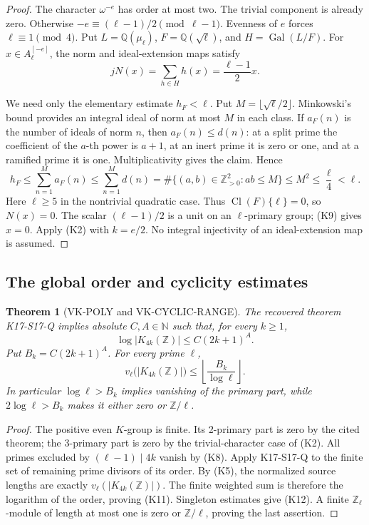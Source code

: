 \documentclass[11pt,a4paper]{article}
\newtheorem{theorem}{Theorem}[section]
\theoremstyle{definition}
\begin{document}
\begin{proof}
The character \(\omega^{-e}\) has order at most two.
The trivial component is already zero. Otherwise
\(-e\equiv(\ell-1)/2\pmod{\ell-1}\).
Evenness of \(e\) forces \(\ell\equiv1\pmod4\).
Put \(L=\mathbb Q(\mu_\ell)\),
\(F=\mathbb Q(\sqrt\ell)\), and \(H=\operatorname{Gal}(L/F)\).
For \(x\in A_\ell^{[-e]}\), the norm and ideal-extension maps
satisfy
\[
 jN(x)=\sum_{h\in H}h(x)=\frac{\ell-1}{2}x.           \tag{K9}
\]

We need only the elementary estimate \(h_F<\ell\).
Put \(M=\lfloor\sqrt\ell/2\rfloor\).
Minkowski's bound \cite[Theorem~4.3, p.~70]{MilneANT}
provides an integral ideal of norm at most \(M\) in each class.
If \(a_F(n)\) is the number of ideals of norm \(n\), then
\(a_F(n)\le d(n)\): at a split prime the coefficient of
the \(a\)-th power is \(a+1\), at an inert prime it is zero or
one, and at a ramified prime it is one. Multiplicativity gives
the claim. Hence
\[
 h_F\le\sum_{n=1}^M a_F(n)
 \le\sum_{n=1}^M d(n)
 =\#\{(a,b)\in\mathbb Z_{>0}^2:ab\le M\}
 \le M^2\le\frac{\ell}{4}<\ell.                      \tag{K10}
\]
Here \(\ell\ge5\) in the nontrivial quadratic case.
Thus \(\operatorname{Cl}(F)\{\ell\}=0\), so \(N(x)=0\).
The scalar \((\ell-1)/2\) is a unit on an \(\ell\)-primary
group; (K9) gives \(x=0\). Apply (K2) with \(k=e/2\).
No integral injectivity of an ideal-extension map is assumed.
\end{proof}

\subsection{The global order and cyclicity estimates}

\begin{theorem}[VK-POLY and VK-CYCLIC-RANGE]
The recovered theorem K17-S17-Q implies absolute
\(C,A\in\mathbb N\) such that, for every \(k\ge1\),
\[
 \log|K_{4k}(\mathbb Z)|\le C(2k+1)^A.               \tag{K11}
\]
Put \(B_k=C(2k+1)^A\). For every prime \(\ell\),
\[
 v_\ell\bigl(|K_{4k}(\mathbb Z)|\bigr)
       \le\left\lfloor\frac{B_k}{\log\ell}\right\rfloor. \tag{K12}
\]
In particular \(\log\ell>B_k\) implies vanishing of the primary
part, while \(2\log\ell>B_k\) makes it either zero or
\(\mathbb Z/\ell\).
\end{theorem}

\begin{proof}
The positive even \(K\)-group is finite. Its 2-primary part is
zero by the cited theorem; the 3-primary part is zero by the
trivial-character case of (K2). All primes excluded by
\((\ell-1)\mid4k\) vanish by (K8).
Apply K17-S17-Q to the finite set of remaining prime divisors
of its order. By (K5), the normalized source lengths are
exactly
\(v_\ell(|K_{4k}(\mathbb Z)|)\). The finite weighted sum is
therefore the logarithm of the order, proving (K11).
Singleton estimates give (K12). A finite
\(\mathbb Z_\ell\)-module of length at most one is zero or
\(\mathbb Z/\ell\), proving the last assertion.
\end{proof}
\end{document}
